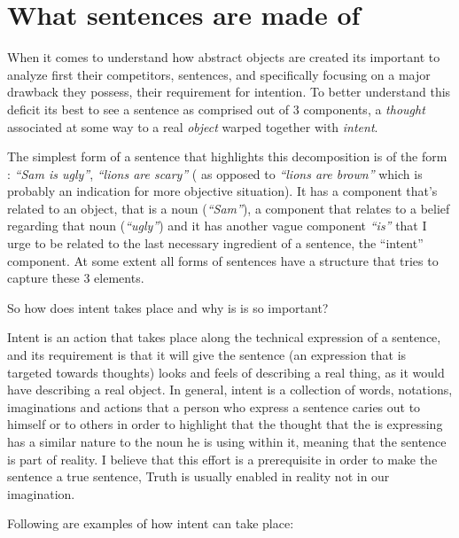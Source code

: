 \documentclass[10pt]{article}
\begin{document}
\newpage 
\section*{What sentences are made of}
When it comes to understand how abstract objects are created its important to analyze first their competitors, sentences, and specifically focusing on  a major drawback they possess, their requirement for intention. To better understand this deficit its best to see a sentence as comprised out of 3 components, a \textit{thought} associated at some way to a real \textit{object} warped together with \textit{intent}.\par
The simplest form of a sentence that highlights this decomposition  is of the form : \textit{“Sam is ugly”}, \textit{“lions are scary”} ( as opposed to \textit{“lions are brown”} which is probably an indication for more objective situation). It has a component that’s  related to an object, that is a noun (\textit{“Sam”}), a component that relates to a belief regarding that noun (\textit{“ugly”}) and it has another vague component \textit{“is”} that I urge to be related to the last necessary ingredient of a sentence, the “intent” component. At some extent all forms of sentences  have a structure that tries to capture these 3 elements.
\par
So how does intent takes place and why is is so important?
\par
Intent is an action that takes place along the technical expression of a sentence, and its requirement is that it will give the sentence (an expression that is targeted towards thoughts) looks and feels of describing a real thing, as it would have describing a real object. In general, intent is a collection of words, notations, imaginations and actions that a person who express a sentence caries out to himself or to others in order to highlight that the thought that the  is expressing has a similar nature to the noun he is using within it, meaning that the sentence is part of reality.  I believe that this effort is a prerequisite in order to make the sentence a true sentence, Truth is usually enabled in reality not in our imagination.
\par
Following are examples of how intent can take place:\par
\end{document}
